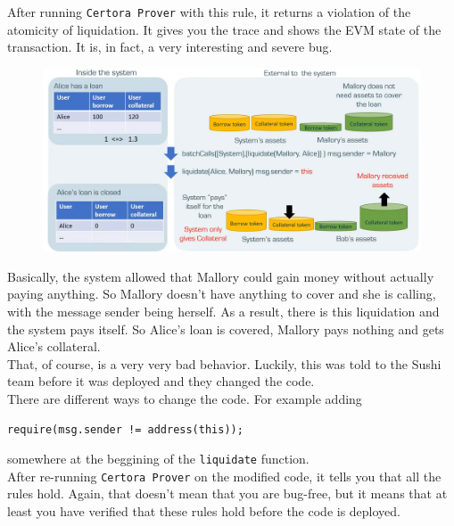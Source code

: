\documentclass[oneside]{book}
\begin{document}
    After running \texttt{Certora Prover} with this rule, it returns a violation of the atomicity of liquidation.
    It gives you the trace and shows the EVM state of the transaction.
    It is, in fact, a very interesting and severe bug.\\

    \begin{figure}[htbp!]
        \centering
        \includegraphics[width=\linewidth]{img/kashipair_bug}
    \end{figure}

    Basically, the system allowed that Mallory could gain money without actually paying anything.
    So Mallory doesn't have anything to cover and she is calling, with the message sender being herself.
    As a result, there is this liquidation and the system pays itself.
    So Alice's loan is covered, Mallory pays nothing and gets Alice's collateral.\\

    That, of course, is a very very bad behavior.
    Luckily, this was told to the Sushi team before it was deployed and they changed the code.\\

    There are different ways to change the code.
    For example adding

    \begin{lstlisting}[language=Solidity, style=SolStyle]
require(msg.sender != address(this));
\end{lstlisting}

    somewhere at the beggining of the \texttt{liquidate} function.\\

    After re-running \texttt{Certora Prover} on the modified code, it tells you that all the rules hold.
    Again, that doesn't mean that you are bug-free, but it means that at least you have verified that these rules hold before the code is deployed.
\end{document}
